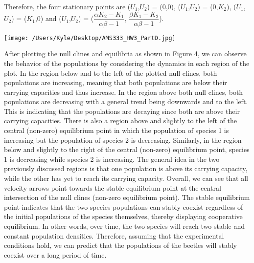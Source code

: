 \documentclass[12pt]{article}
\begin{document}
\begin{flushleft}
Therefore, the four stationary points are ($U_1$,$U_2$) = (0,0), ($U_1$,$U_2$) = (0,$K_2$), ($U_1$,$U_2$) = ($K_1$,0) and ($U_1$,$U_2$) = ($\dfrac{{\alpha}K_2 - K_1}{{\alpha}{\beta} - 1}$, $\dfrac{{\beta}K_1 - K_2}{{\alpha}{\beta} - 1}$). 
\end{flushleft} 

\begin{center}
   \texttt{[image: /Users/Kyle/Desktop/AMS333\_HW3\_PartD.jpg]}
\end{center}

After plotting the null clines and equilibria as shown in Figure 4, we can observe the behavior of the populations by considering the dynamics in each region of the plot. In the region below and to the left of the plotted null clines, both populations are increasing, meaning that both populations are below their carrying capacities and thus increase. In the region above both null clines, both populations are decreasing with a general trend being downwards and to the left. This is indicating that the populations are decaying since both are above their carrying capacities. There is also a region above and slightly to the left of the central (non-zero) equilibrium point in which the population of species 1 is increasing but the population of species 2 is decreasing. Similarly, in the region below and slightly to the right of the central (non-zero) equilibrium point, species 1 is decreasing while species 2 is increasing. The general idea in the two previously discussed regions is that one population is above its carrying capacity, while the other has yet to reach its carrying capacity. Overall, we can see that all velocity arrows point towards the stable equilibrium point at the central intersection of the null clines (non-zero equilibrium point). The stable equilibrium point indicates that the two species populations can stably coexist regardless of the initial populations of the species themselves, thereby displaying cooperative equilibrium. In other words, over time, the two species will reach two stable and constant population densities. Therefore, assuming that the experimental conditions hold, we can predict that the populations of the beetles will stably coexist over a long period of time.
\end{document}
